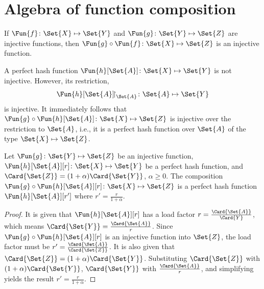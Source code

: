 \documentclass[ ../main.tex]{subfiles}
\begin{document}
\section{Algebra of function composition}
If $\Fun{f} \colon \Set{X} \mapsto \Set{Y}$ and $\Fun{g} \colon \Set{Y} \mapsto \Set{Z}$ are injective functions, then $\Fun{g} \circ \Fun{f} \colon \Set{X} \mapsto \Set{Z}$ is an injective function.

A perfect hash function $\Fun{h}[\Set{A}] \colon \Set{X} \mapsto \Set{Y}$ is not injective.
However, its restriction,
\begin{equation}
	\Fun{h}[\Set{A}]\!\restriction_{\Set{A}} \colon \Set{A} \mapsto \Set{Y}
\end{equation}
is injective.
It immediately follows that $\Fun{g} \circ \Fun{h}[\Set{A}] \colon \Set{X} \mapsto \Set{Z}$ is injective over the restriction to $\Set{A}$, i.e., it is a perfect hash function over $\Set{A}$ of the type $\Set{X} \mapsto \Set{Z}$.

\begin{theorem}
Let $\Fun{g} \colon \Set{Y} \mapsto \Set{Z}$ be an injective function, $\Fun{h}[\Set{A}][r] \colon \Set{X} \mapsto \Set{Y}$ be a perfect hash function, and  $\Card{\Set{Z}} = (1 + \alpha) \Card{\Set{Y}}$, $\alpha \geq 0$.
The composition $\Fun{g} \circ \Fun{h}[\Set{A}][r] \colon \Set{X} \mapsto \Set{Z}$ is a perfect hash function $\Fun{h}[\Set{A}][r']$ where $r' = \frac{r}{1+\alpha}$.
\end{theorem}
\begin{proof}
It is given that $\Fun{h}[\Set{A}][r]$ has a load factor $r = \frac{\Card{\Set{A}}}{\Card{Y}}$, which means $\Card{\Set{Y}} = \frac{\Card{\Set{A}}}{r}$.
Since $\Fun{g} \circ \Fun{h}[\Set{A}][r]$ is an injective function into $\Set{Z}$, the load factor must be $r' = \frac{\Card{\Set{A}}}{\Card{\Set{Z}}}$.
It is also given that $\Card{\Set{Z}} = (1+\alpha) \Card{\Set{Y}}$.
Substituting $\Card{\Set{Z}}$ with $(1+\alpha) \Card{\Set{Y}}$, $\Card{\Set{Y}}$ with $\frac{\Card{\Set{A}}}{r}$, and simplifying yields the result $r' = \frac{r}{1+\alpha}$.
\end{proof}
\end{document}
